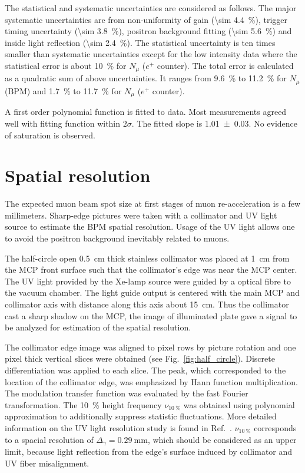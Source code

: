 \documentclass[preprint,3p,twocolumn]{elsarticle}
\begin{document}
The statistical and systematic uncertainties are considered as
follows. The major systematic uncertainties are from
non-uniformity of gain (\SI{\sim 4.4}{\percent}), trigger timing
uncertainty (\SI{\sim 3.8}{\percent}), positron background
fitting (\SI{\sim 5.6}{\percent}) and inside light reflection
(\SI{\sim 2.4}{\percent}).  The statistical uncertainty is ten
times smaller than systematic uncertainties except for the low
intensity data where the statistical error is about
\SI{10}{\percent} for $N_\mu$ ($e^+$ counter).  The total error
is calculated as a quadratic sum of above uncertainties. It
ranges from \SI{9.6}{\percent} to \SI{11.2}{\percent} for $N_\mu$
(BPM) and \SI{1.7}{\percent} to \SI{11.7}{\percent} for $N_\mu$
($e^+$ counter).

A first order polynomial function is fitted to data.  Most
measurements agreed well with fitting function within $2\sigma$.
The fitted slope is \num{1.01 \pm 0.03}. No evidence of
saturation is observed.

\section{Spatial resolution}
 
The expected muon beam spot size at first stages of muon
re-acceleration is a few millimeters.  Sharp-edge pictures were
taken with a collimator and UV light source to estimate the BPM
spatial resolution.  Usage of the UV light allows one to avoid
the positron background inevitably related to muons.

The half-circle open \SI{.5}{\cm} thick stainless collimator was
placed at \SI{1}{\cm} from the MCP front surface such that the
collimator's edge was near the MCP center.  The UV light provided
by the Xe-lamp source were guided by a optical fibre to the
vacuum chamber.  The light guide output is centered with the main
MCP and collimator axis with distance along this axis about
\SI{15}{\cm}.  Thus the collimator cast a sharp shadow on the
MCP, the image of illuminated plate gave a signal to be analyzed
for estimation of the spatial resolution.

The collimator edge image was aligned to pixel rows by picture
rotation and one pixel thick vertical slices were obtained (see
Fig.~\ref{fig:half_circle}).  Discrete differentiation was
applied to each slice.  The peak, which corresponded to the
location of the collimator edge, was emphasized by Hann function
multiplication.  The modulation transfer function was evaluated
by the fast Fourier transformation.  The \SI{10}{\percent} height
frequency $\nu_{\SI{10}{\percent}}$ was obtained using polynomial
approximation to additionally suppress statistic fluctuations.
More detailed information on the UV light resolution study is
found in Ref.~\cite{Gosha}.  $\nu_{\SI{10}{\percent}}$
corresponds to a spacial resolution of
$\Delta_\gamma = \SI{0.29}{\mm}$, which should be considered as
an upper limit, because light reflection from the edge's surface
induced by collimator and UV fiber misalignment.
\end{document}
